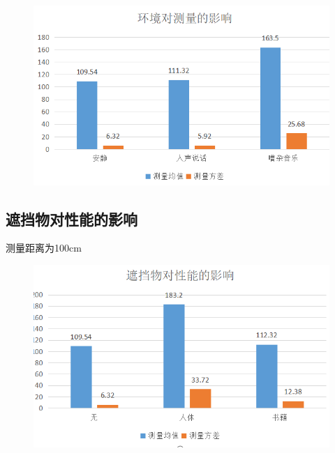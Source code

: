 \begin{figure}[h!]
    \centering
    \includegraphics[width=0.6\linewidth]{2.png}
\end{figure}

\newpage

\subsection{遮挡物对性能的影响}

测量距离为100cm

\begin{figure}[h!]
    \centering
    \includegraphics[width=0.6\linewidth]{3.png}
\end{figure}